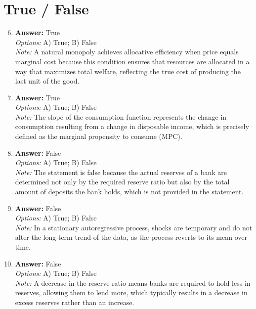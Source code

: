 \documentclass[12pt]{article}
\begin{document}
\section*{True / False}
\begin{enumerate}[label=\arabic*.]
\setcounter{enumi}{5}
\item \textbf{Answer:} True
\\ \textit{Options:} A) True; B) False
\\ \textit{Note:} A natural monopoly achieves allocative efficiency when price equals marginal cost because this condition ensures that resources are allocated in a way that maximizes total welfare, reflecting the true cost of producing the last unit of the good.
\item \textbf{Answer:} True
\\ \textit{Options:} A) True; B) False
\\ \textit{Note:} The slope of the consumption function represents the change in consumption resulting from a change in disposable income, which is precisely defined as the marginal propensity to consume (MPC).
\item \textbf{Answer:} False
\\ \textit{Options:} A) True; B) False
\\ \textit{Note:} The statement is false because the actual reserves of a bank are determined not only by the required reserve ratio but also by the total amount of deposits the bank holds, which is not provided in the statement.
\item \textbf{Answer:} False
\\ \textit{Options:} A) True; B) False
\\ \textit{Note:} In a stationary autoregressive process, shocks are temporary and do not alter the long-term trend of the data, as the process reverts to its mean over time.
\item \textbf{Answer:} False
\\ \textit{Options:} A) True; B) False
\\ \textit{Note:} A decrease in the reserve ratio means banks are required to hold less in reserves, allowing them to lend more, which typically results in a decrease in excess reserves rather than an increase.
\end{enumerate}
\end{document}
